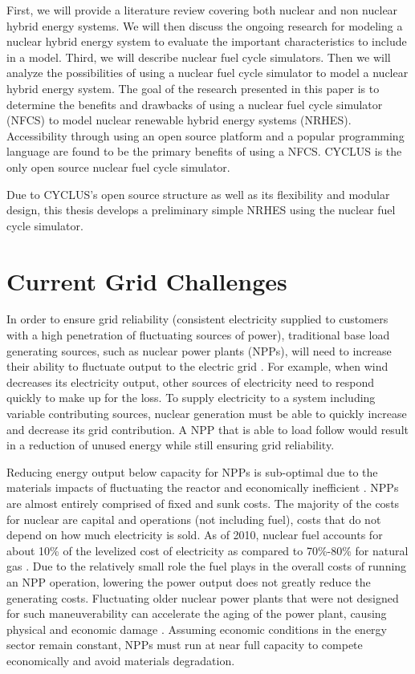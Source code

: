 \documentclass[12pt]{UIdahoMastersThesis}
\begin{document}
First, we will provide a literature review covering both nuclear and non nuclear hybrid energy systems.  We will then discuss the ongoing research for modeling a nuclear hybrid energy system to evaluate the important characteristics to include in a model. Third, we will describe nuclear fuel cycle simulators. Then we will analyze the possibilities of using a nuclear fuel cycle simulator to model a nuclear hybrid energy system. The goal of the research presented in this paper is to determine the benefits and drawbacks of using a nuclear fuel cycle simulator (NFCS) to model nuclear renewable hybrid energy systems (NRHES).  Accessibility through using an open source platform and a popular programming language are found to be the primary benefits of using a NFCS. CYCLUS is the only open source nuclear fuel cycle simulator.

Due to CYCLUS's open source structure as well as its flexibility and modular design, this thesis develops a preliminary simple NRHES using the nuclear fuel cycle simulator.

\section{Current Grid Challenges}
In order to ensure grid reliability (consistent electricity supplied to customers with a high penetration of fluctuating sources of power), traditional base load generating sources, such as nuclear power plants (NPPs), will need to increase their ability to fluctuate output to the electric grid \cite {Denholm2011}. For example, when wind decreases its electricity output, other sources of electricity need to respond quickly to make up for the loss. To supply electricity to a system including variable contributing sources, nuclear generation must be able to quickly increase and decrease its grid contribution. A NPP that is able to load follow would result in a reduction of unused energy while still ensuring grid reliability.

Reducing energy output below capacity for NPPs is sub-optimal due to the materials impacts of fluctuating the reactor and economically inefficient \cite{Nuclear2011}. NPPs are almost entirely comprised of fixed and sunk costs. The majority of the costs for nuclear are capital and operations (not including fuel), costs that do not depend on how much electricity is sold. As of 2010, nuclear fuel accounts for about 10\% of the levelized cost of electricity as compared to 70\%-80\% for natural gas \cite{IEA/NEA}. Due to the relatively small role the fuel plays in the overall costs of running an NPP operation, lowering the power output does not greatly reduce the generating costs. Fluctuating older nuclear power plants that were not designed for such maneuverability can accelerate the aging of the power plant, causing physical and economic damage \cite{Nuclear2011}. Assuming economic conditions in the energy sector remain constant, NPPs must run at near full capacity to compete economically and avoid materials degradation.
\end{document}
